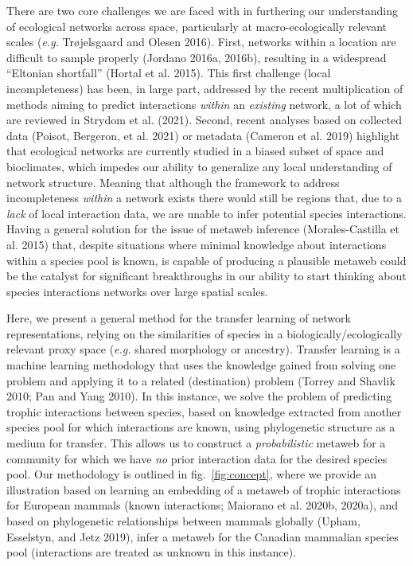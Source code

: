 \documentclass[10pt,oneside]{article}
\begin{document}
There are two core challenges we are faced with in furthering our
understanding of ecological networks across space, particularly at
macro-ecologically relevant scales (\emph{e.g.} Trøjelsgaard and Olesen
2016). First, networks within a location are difficult to sample
properly (Jordano 2016a, 2016b), resulting in a widespread ``Eltonian
shortfall'' (Hortal et al. 2015). This first challenge (local
incompleteness) has been, in large part, addressed by the recent
multiplication of methods aiming to predict interactions \emph{within}
an \emph{existing} network, a lot of which are reviewed in Strydom et
al. (2021). Second, recent analyses based on collected data (Poisot,
Bergeron, et al. 2021) or metadata (Cameron et al. 2019) highlight that
ecological networks are currently studied in a biased subset of space
and bioclimates, which impedes our ability to generalize any local
understanding of network structure. Meaning that although the framework
to address incompleteness \emph{within} a network exists there would
still be regions that, due to a \emph{lack} of local interaction data,
we are unable to infer potential species interactions. Having a general
solution for the issue of metaweb inference (Morales-Castilla et al.
2015) that, despite situations where minimal knowledge about
interactions within a species pool is known, is capable of producing a
plausible metaweb could be the catalyst for significant breakthroughs in
our ability to start thinking about species interactions networks over
large spatial scales.

Here, we present a general method for the transfer learning of network
representations, relying on the similarities of species in a
biologically/ecologically relevant proxy space (\emph{e.g.} shared
morphology or ancestry). Transfer learning is a machine learning
methodology that uses the knowledge gained from solving one problem and
applying it to a related (destination) problem (Torrey and Shavlik 2010;
Pan and Yang 2010). In this instance, we solve the problem of predicting
trophic interactions between species, based on knowledge extracted from
another species pool for which interactions are known, using
phylogenetic structure as a medium for transfer. This allows us to
construct a \emph{probabilistic} metaweb for a community for which we
have \emph{no} prior interaction data for the desired species pool. Our
methodology is outlined in fig.~\ref{fig:concept}, where we provide an
illustration based on learning an embedding of a metaweb of trophic
interactions for European mammals (known interactions; Maiorano et al.
2020b, 2020a), and based on phylogenetic relationships between mammals
globally (Upham, Esselstyn, and Jetz 2019), infer a metaweb for the
Canadian mammalian species pool (interactions are treated as unknown in
this instance).
\end{document}
